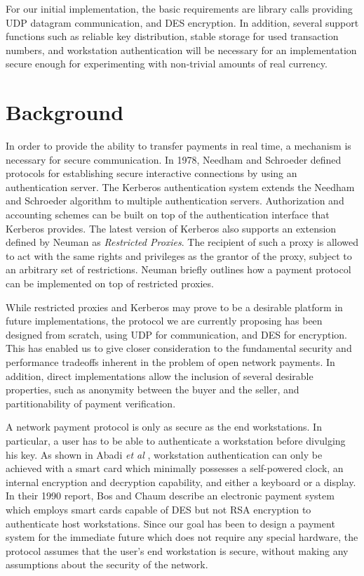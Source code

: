For our initial implementation, the basic requirements are library calls
providing UDP datagram
communication, and DES encryption.  In addition, several support
functions such as reliable key distribution, stable storage for used
transaction numbers, and workstation authentication will be necessary for
an implementation secure enough for experimenting with non-trivial amounts
of real currency.

\section{Background}

In order to provide the ability to transfer payments in real time, a
mechanism is necessary for secure communication.  In 1978, Needham and
Schroeder \cite{kn:needham78} defined protocols for establishing secure interactive
connections by using an authentication server.
The Kerberos \cite{kn:steiner88} authentication system
extends the Needham and Schroeder algorithm to multiple authentication
servers.  Authorization and accounting schemes can be built on top of the
authentication interface that Kerberos provides.  The latest version
of Kerberos also supports an extension defined by Neuman
\cite{kn:neuman91} as
{\it Restricted Proxies}.  The recipient of such a proxy is allowed to act
with the same rights and privileges as the grantor of the proxy, subject to
an arbitrary set of restrictions.  Neuman briefly outlines how a payment
protocol can be implemented on top of restricted proxies.

While restricted proxies and Kerberos may prove to be a desirable
platform in future implementations, the protocol we are currently
proposing has been designed from scratch, using UDP for communication,
and DES for encryption.  This has enabled us to give closer
consideration to the fundamental security and performance tradeoffs
inherent in the problem of open network payments.  In addition, direct
implementations allow the inclusion of several desirable properties,
such as anonymity between the buyer and the seller, and
partitionability of payment verification.

A network payment protocol is only as secure as the end workstations.  In
particular, a user has to be able to authenticate a workstation before
divulging his key.
As shown in Abadi {\it et al} \cite{kn:abadi90}, workstation authentication
can only be
achieved with a smart card which minimally possesses a self-powered clock,
an internal encryption and decryption capability, and either a keyboard or
a display.  In their 1990 report, Bos and Chaum \cite{kn:bos90} describe an
electronic payment system which employs smart cards capable of DES but not
RSA encryption to authenticate host workstations.  Since our goal has been to
design a payment system for the immediate future which does not require any
special hardware,
the protocol assumes that the user's end
workstation is secure, without making any assumptions about the security of
the network.

